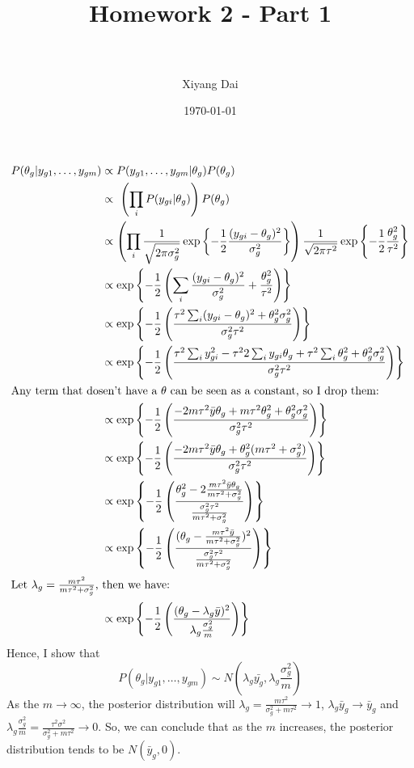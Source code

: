 \documentclass[paper=letter, fontsize=11pt]{scrartcl} %
\title{	
\normalfont \normalsize 
\horrule{0.5pt} \\[0.1cm] %
\huge Homework 2 - Part 1 \\ %
\horrule{2pt} \\[0.1cm] %
}
\author{Xiyang Dai} %
\date{\normalsize\today} %
\numberwithin{equation}{section} %
\numberwithin{figure}{section} %
\numberwithin{table}{section} %
\begin{document}
\maketitle %

\subsection*{}
\begin{align*}
\begin{split}
	P(\theta_g|y_{g1}, \dots, y_{gm}) &\propto P(y_{g1}, \dots, y_{gm}|\theta_g) P(\theta_g)\\
	&\propto\ \left(\prod_i P(y_{gi}|\theta_g)\right) P(\theta_g)\\
	&\propto \left(\prod_i\frac{1}{\sqrt{2\pi\sigma_g^2}}\exp\left\{-\frac{1}{2}\frac{(y_{gi}-\theta_g)^2}{\sigma_g^2} \right\}\right) \frac{1}{\sqrt{2\pi\tau^2}}\exp\left\{-\frac{1}{2}\frac{\theta_g^2}{\tau^2} \right\}\\
	&\propto \exp\left\{-\frac{1}{2}\left(\sum_i\frac{(y_{gi}-\theta_g)^2}{\sigma_g^2}+\frac{\theta_g^2}{\tau^2} \right)\right\}\\
	&\propto \exp\left\{-\frac{1}{2}\left(\frac{\tau^2\sum_i(y_{gi}-\theta_g)^2+\theta_g^2\sigma_g^2}{\sigma_g^2\tau^2} \right)\right\}\\	
	&\propto \exp\left\{-\frac{1}{2}\left(\frac{\tau^2\sum_iy_{gi}^2-\tau^22\sum_iy_{gi}\theta_g + \tau^2\sum_i\theta_g^2+\theta_g^2\sigma_g^2}{\sigma_g^2\tau^2} \right)\right\}\\
	\intertext{Any term that dosen't have a $\theta$ can be seen as a constant, so I drop them:}	
	&\propto \exp\left\{-\frac{1}{2}\left(\frac{-2m\tau^2\bar{y}\theta_g + m\tau^2\theta_g^2+\theta_g^2\sigma_g^2}{\sigma_g^2\tau^2} \right)\right\}\\
	&\propto \exp\left\{-\frac{1}{2}\left(\frac{-2m\tau^2\bar{y}\theta_g + \theta_g^2(m\tau^2+\sigma_g^2)}{\sigma_g^2\tau^2} \right)\right\}\\
	&\propto \exp\left\{-\frac{1}{2}\left(\frac{\theta_g^2 -2\frac{m\tau^2\bar{y}\theta_g}{m\tau^2+\sigma_g^2}}{\frac{\sigma_g^2\tau^2}{m\tau^2+\sigma_g^2}} \right)\right\}\\	
	&\propto \exp\left\{-\frac{1}{2}\left(\frac{(\theta_g -\frac{m\tau^2\bar{y}}{m\tau^2+\sigma_g^2})^2}{\frac{\sigma_g^2\tau^2}{m\tau^2+\sigma_g^2}} \right)\right\}\\
	\intertext{Let $\lambda_g = \frac{m\tau^2}{m\tau^2+\sigma_g^2}$, then we have:}	
	&\propto \exp\left\{-\frac{1}{2}\left(\frac{(\theta_g -\lambda_g\bar{y})^2}{\lambda_g\frac{\sigma_g^2}{m}} \right)\right\}\\
\end{split}
\end{align*}
Hence, I show that
\[
P(\theta_g|y_{g1}, \dots, y_{gm}) \sim N(\lambda_g\bar{y_g},\lambda_g\frac{\sigma_g^2}{m})
\]
As the $m \rightarrow \infty$, the posterior distribution will $\lambda_g = \frac{m\tau^2}{\sigma_g^2+m\tau^2} \rightarrow 1$, $\lambda_g\bar{y}_g \rightarrow \bar{y}_g$ and $\lambda_g\frac{\sigma_g^2}{m}=\frac{\tau^2\sigma^2}{\sigma_g^2+m\tau^2} \rightarrow 0$. So, we can conclude that as the $m$ increases, the posterior distribution tends to be $N(\bar{y}_g,0)$.
\end{document}

